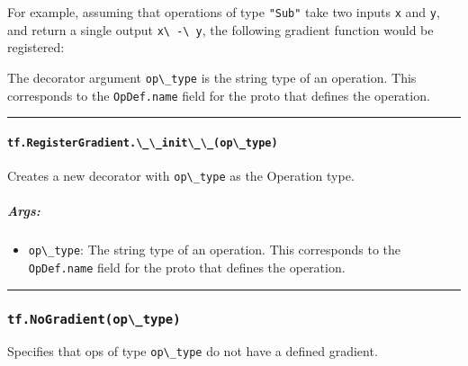 For example, assuming that operations of type \lstinline{"Sub"} take two
inputs \lstinline{x} and \lstinline{y}, and return a single output
\lstinline{x\ -\ y}, the following gradient function would be registered:

\begin{Shaded}
\begin{Highlighting}[]
\NormalTok{(}\NormalTok{)}
 
   
\end{Highlighting}
\end{Shaded}

The decorator argument \lstinline{op\_type} is the string type of an
operation. This corresponds to the \lstinline{OpDef.name} field for the
proto that defines the operation.

\begin{center}\rule{0.5\linewidth}{\linethickness}\end{center}

\paragraph{\texorpdfstring{\lstinline{tf.RegisterGradient.\_\_init\_\_(op\_type)}
}{tf.RegisterGradient.\_\_init\_\_(op\_type) }}\label{tf.registergradient.ux5fux5finitux5fux5fopux5ftype}

Creates a new decorator with \lstinline{op\_type} as the Operation type.

\subparagraph{Args: }\label{args-28}

\begin{itemize}
\tightlist
\item
  \lstinline{op\_type}: The string type of an operation. This corresponds
  to the \lstinline{OpDef.name} field for the proto that defines the
  operation.
\end{itemize}

\begin{center}\rule{0.5\linewidth}{\linethickness}\end{center}

\subsubsection{\texorpdfstring{\lstinline{tf.NoGradient(op\_type)}
}{tf.NoGradient(op\_type) }}\label{tf.nogradientopux5ftype}

Specifies that ops of type \lstinline{op\_type} do not have a defined
gradient.

